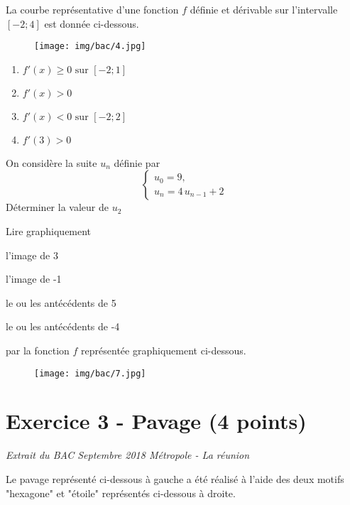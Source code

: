 \documentclass[answers]{exam}
\begin{document}
\begin{questions}
  \question[1] La courbe représentative d’une fonction $f$ définie et dérivable sur l’intervalle $[-2;4]$ est donnée ci-dessous.

\begin{figure}[H]
  \centering
  \texttt{[image: img/bac/4.jpg]}
\end{figure}

\begin{enumerate}
  \item $f'(x) \ge 0 \text{ sur } [-2;1]$
  \item $f'(x) > 0$
  \item $f'(x) < 0 \text{ sur } [-2;2]$
  \item $f'(3) > 0$
\end{enumerate}

  
\question[1] On considère la suite $u_n$ définie par
  \[
    \begin{cases}
      u_0 = 9, \\[4pt]
      u_n = 4\,u_{n-1} + 2 
    \end{cases}
  \]
  Déterminer la valeur de $u_2$


\question[1] Lire graphiquement
\begin{compactenum}
\item l'image de 3
\item l'image de -1
\item le ou les antécédents de 5
\item le ou les antécédents de -4
\end{compactenum}
par la fonction $f$ représentée graphiquement ci-dessous.

\begin{figure}[H]
  \centering
  \texttt{[image: img/bac/7.jpg]}
\end{figure}

\end{questions}


\section*{Exercice 3 - Pavage (4 points)}

\textit{Extrait du BAC Septembre 2018 Métropole - La réunion}

\vspace{1em}

Le pavage représenté ci-dessous à gauche a été réalisé à l’aide des deux motifs "hexagone" et "étoile" représentés ci-dessous à droite.
\end{document}
